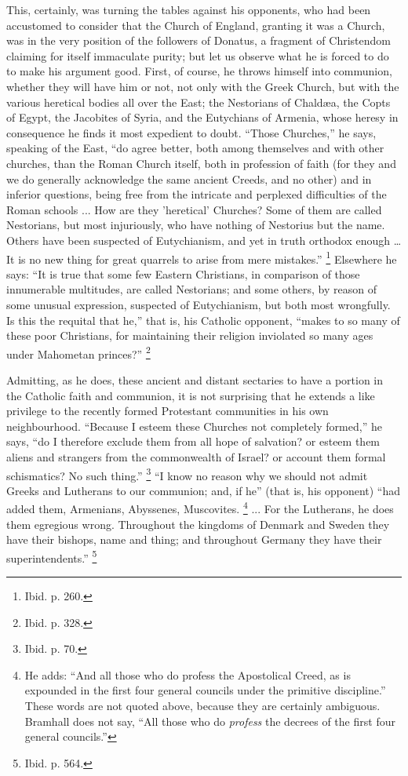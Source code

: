 This, certainly, was turning the tables against his opponents, who
had been accustomed to consider that the Church of England, granting
it was a Church, was in the very position of the followers of Donatus,
a fragment of Christendom claiming for itself immaculate purity; but
let us observe what he is forced to do to make his argument good.
First, of course, he throws himself into communion, whether they will
have him or not, not only with the Greek Church, but with the various
heretical bodies all over the East; the Nestorians of Chaldæa, the
Copts of Egypt, the Jacobites of Syria, and the Eutychians of Armenia,
whose heresy in consequence he finds it most expedient to doubt.
``Those Churches,'' he says, speaking of the East, ``do
agree better, both among themselves and with other churches, than the
Roman Church itself, both in profession of faith (for they and we do
generally acknowledge the same ancient Creeds, and no other) and in
inferior questions, being free from the intricate and perplexed
difficulties of the Roman schools ... How are they 'heretical'
Churches? Some of them are called Nestorians, but most injuriously,
who have nothing of Nestorius but the name. Others have been suspected
of Eutychianism, and yet in truth orthodox enough … It is no new
thing for great quarrels to arise from mere mistakes.'' \footnote{Ibid. p. 260.} Elsewhere he says: ``It is true that some few Eastern
Christians, in comparison of those innumerable multitudes, are called
Nestorians; and some others, by reason of some unusual expression,
suspected of Eutychianism, but both most wrongfully. Is this the
requital that he,'' that is, his Catholic opponent, ``makes to
so many of these poor Christians, for maintaining their religion
inviolated so many ages under Mahometan princes?'' \footnote{Ibid. p. 328.}

Admitting, as he does, these ancient and distant sectaries to have
a portion in the Catholic faith and communion, it is not surprising
that he extends a like privilege to the recently formed Protestant
communities in his own neighbourhood. ``Because I esteem these
Churches not completely formed,'' he says, ``do I therefore
exclude them from all hope of salvation? or esteem them aliens and
strangers from the commonwealth of Israel? or account them formal
schismatics? No such thing.'' \footnote{Ibid. p. 70.} ``I know no reason why we should not admit Greeks and
Lutherans to our communion; and, if he'' (that is, his opponent)
``had added them, Armenians, Abyssenes, Muscovites. \footnote{He adds: ``And all those who do profess
the Apostolical Creed, as is expounded in the first four general
councils under the primitive discipline.'' These words are not
quoted above, because they are certainly ambiguous. Bramhall does not
say, ``All those who do \emph{profess} the decrees of the first
four general councils.''} ... For the Lutherans, he does them egregious wrong.
Throughout the kingdoms of Denmark and Sweden they have their bishops,
name and thing; and throughout Germany they have their
superintendents.'' \footnote{Ibid. p. 564.}

